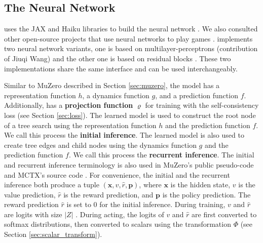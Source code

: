 \subsection{The \moozi Neural Network} \label{sec:nn}
\moozi uses the JAX and Haiku libraries to build the neural network \cite{HaikuSonnetJAX_Hennigan.Cai.ea_2020,CompilingMachineLearning_Frostig.Johnson.ea_2018,JAXComposableTransformations_JamesBradbury.RoyFrostig.ea_2018}.
We also consulted other open-source projects that use neural networks to play games \cite{MuZeroGeneral_Duvaud.AureleHainaut_2022, MasteringAtariGames_Ye.Liu.ea_2021, AcceleratingSelfPlayLearning_Wu_2020}.
\moozi implements two neural network variants, one is based on multilayer-perceptrons (contribution of Jiuqi Wang) and the other one is based on residual blocks \cite{DeepResidualLearning_He.Zhang.ea_2016}.
These two implementations share the same interface and can be used interchangeably.

Similar to MuZero described in Section \ref{sec:muzero}, the model has a representation function $h$, a dynamics function $g$, and a prediction function $f$.
Additionally, \moozi has a \textbf{projection function} $\varrho$ for training with the self-consistency loss (see Section \ref{sec:loss}).
The learned model is used to construct the root node of a tree search using the representation function $h$ and the prediction function $f$.
We call this process the \textbf{initial inference}.
The learned model is also used to create tree edges and child nodes using the dynamics function $g$ and the prediction function $f$.
We call this process the \textbf{recurrent inference}.
The initial and recurrent inference terminology is also used in MuZero's public pseudo-code and MCTX's source code \cite{MasteringChessShogi_Silver.Hubert.ea_2017,MctxMCTSinJAX_IvoDanihelka_2022}.
For convenience, the initial and the recurrent inference both produce a tuple $(\mathbf{x}, v, \hat{r}, \mathbf{p})$, where $\mathbf{x}$ is the hidden state, $v$ is the value prediction, $\hat{r}$ is the reward prediction, and $\mathbf{p}$ is the policy prediction.
The reward prediction $\hat{r}$ is set to 0 for the initial inference.
During training, $v$ and $\hat{r}$ are logits with size $|Z|$ .
During acting, the logits of $v$ and $\hat{r}$ are first converted to softmax distributions, then converted to scalars using the transformation $\Phi$ (see Section \ref{sec:scalar_transform}).

